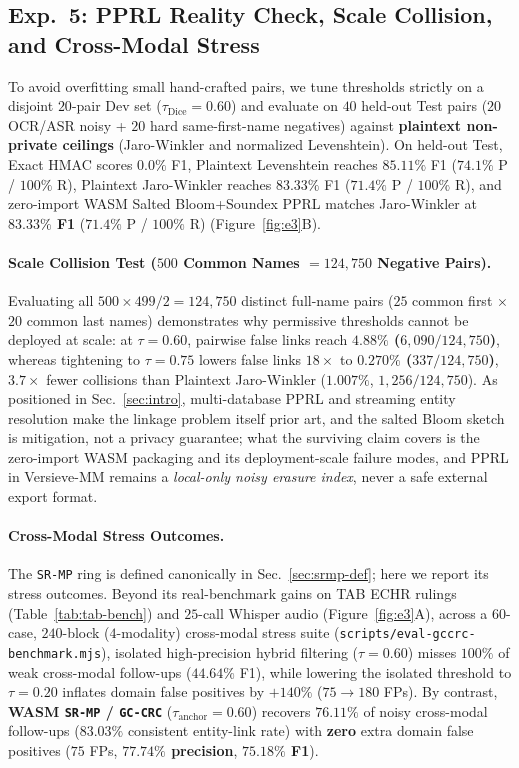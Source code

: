 \documentclass{article}
\begin{document}
\subsection{Exp.~5: PPRL Reality Check, Scale Collision, and Cross-Modal Stress}
\label{sec:exp5}

To avoid overfitting small hand-crafted pairs, we tune thresholds strictly on a disjoint $20$-pair Dev set ($\tau_{\text{Dice}}{=}0.60$) and evaluate on $40$ held-out Test pairs ($20$ OCR/ASR noisy + $20$ hard same-first-name negatives) against \textbf{plaintext non-private ceilings} (Jaro-Winkler and normalized Levenshtein). On held-out Test, Exact HMAC scores $0.0\%$ F1, Plaintext Levenshtein reaches $85.11\%$ F1 ($74.1\%$ P / $100\%$ R), Plaintext Jaro-Winkler reaches $83.33\%$ F1 ($71.4\%$ P / $100\%$ R), and zero-import WASM Salted Bloom+Soundex PPRL matches Jaro-Winkler at \textbf{$83.33\%$ F1} ($71.4\%$ P / $100\%$ R) (Figure~\ref{fig:e3}B).

\paragraph{Scale Collision Test ($500$ Common Names $= 124{,}750$ Negative Pairs).}
Evaluating all $500 \times 499 / 2 = 124{,}750$ distinct full-name pairs ($25$ common first $\times$ $20$ common last names) demonstrates why permissive thresholds cannot be deployed at scale: at $\tau{=}0.60$, pairwise false links reach \textbf{$4.88\%$ ($6{,}090/124{,}750$)}, whereas tightening to $\tau{=}0.75$ lowers false links $18\times$ to \textbf{$0.270\%$ ($337/124{,}750$)}, $3.7\times$ fewer collisions than Plaintext Jaro-Winkler ($1.007\%$, $1{,}256/124{,}750$). As positioned in Sec.~\ref{sec:intro}, multi-database PPRL \citep{vatsalan2017multippprl} and streaming entity resolution \citep{ren2021terids} make the linkage problem itself prior art, and the salted Bloom sketch is mitigation, not a privacy guarantee; what the surviving claim covers is the zero-import WASM packaging and its deployment-scale failure modes, and PPRL in Versieve-MM remains a \emph{local-only noisy erasure index}, never a safe external export format.

\paragraph{Cross-Modal Stress Outcomes.}
The \texttt{SR-MP} ring is defined canonically in Sec.~\ref{sec:srmp-def}; here we report its stress outcomes. Beyond its real-benchmark gains on TAB ECHR rulings (Table~\ref{tab:tab-bench}) and $25$-call Whisper audio (Figure~\ref{fig:e3}A), across a $60$-case, $240$-block ($4$-modality) cross-modal stress suite (\texttt{scripts/eval-gccrc-benchmark.mjs}), isolated high-precision hybrid filtering ($\tau{=}0.60$) misses $100\%$ of weak cross-modal follow-ups ($44.64\%$ F1), while lowering the isolated threshold to $\tau{=}0.20$ inflates domain false positives by $+140\%$ ($75 \to 180$ FPs). By contrast, \textbf{WASM \texttt{SR-MP} / \texttt{GC-CRC}} ($\tau_{\text{anchor}}{=}0.60$) recovers \textbf{$76.11\%$} of noisy cross-modal follow-ups ($83.03\%$ consistent entity-link rate) with \textbf{zero} extra domain false positives ($75$ FPs, \textbf{$77.74\%$ precision}, \textbf{$75.18\%$ F1}).
\end{document}
